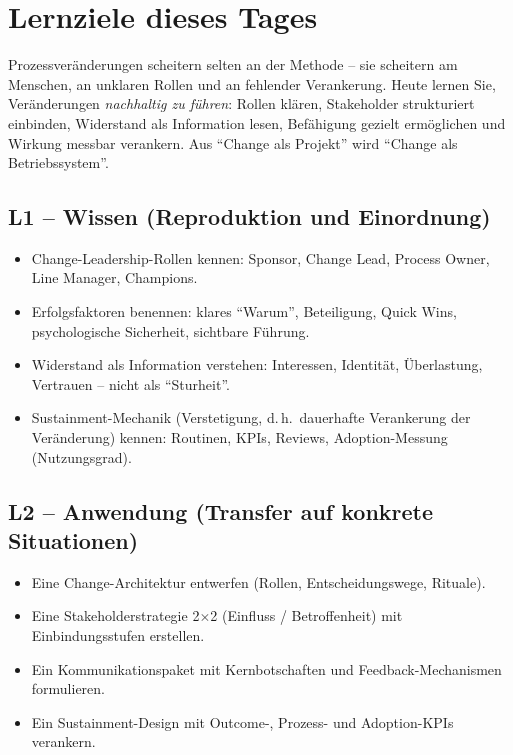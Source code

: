 \documentclass[11pt,a4paper,oneside]{article}
\begin{document}
\section*{Lernziele dieses Tages}
\thispagestyle{plain}

\noindent Prozessveränderungen scheitern selten an der Methode -- sie scheitern am Menschen, an unklaren Rollen und an fehlender Verankerung. Heute lernen Sie, Veränderungen \emph{nachhaltig zu führen}: Rollen klären, Stakeholder strukturiert einbinden, Widerstand als Information lesen, Befähigung gezielt ermöglichen und Wirkung messbar verankern. Aus ``Change als Projekt'' wird ``Change als Betriebssystem''.

\subsection*{L1 -- Wissen (Reproduktion und Einordnung)}
\begin{itemize}
  \item Change-Leadership-Rollen kennen: Sponsor, Change Lead, Process Owner, Line Manager, Champions.
  \item Erfolgsfaktoren benennen: klares ``Warum'', Beteiligung, Quick Wins, psychologische Sicherheit, sichtbare Führung.
  \item Widerstand als Information verstehen: Interessen, Identität, Überlastung, Vertrauen -- nicht als ``Sturheit''.
  \item Sustainment-Mechanik (Verstetigung, d.\,h.\ dauerhafte Verankerung der Veränderung) kennen: Routinen, KPIs, Reviews, Adoption-Messung (Nutzungsgrad).
\end{itemize}

\subsection*{L2 -- Anwendung (Transfer auf konkrete Situationen)}
\begin{itemize}
  \item Eine Change-Architektur entwerfen (Rollen, Entscheidungswege, Rituale).
  \item Eine Stakeholderstrategie 2$\times$2 (Einfluss / Betroffenheit) mit Einbindungsstufen erstellen.
  \item Ein Kommunikationspaket mit Kernbotschaften und Feedback-Mechanismen formulieren.
  \item Ein Sustainment-Design mit Outcome-, Prozess- und Adoption-KPIs verankern.
\end{itemize}
\end{document}
